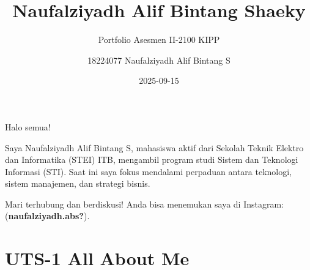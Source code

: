 \documentclass[
  letterpaper,
  DIV=11,
  numbers=noendperiod]{scrreprt}
\title{Naufalziyadh Alif Bintang Shaeky}
\subtitle{Portfolio Asesmen II-2100 KIPP}
\author{18224077 Naufalziyadh Alif Bintang S}
\date{2025-09-15}
\renewcommand*\contentsname{Table of contents}
\newcommand\contentsname{Table of contents}
\begin{document}
\maketitle

\renewcommand*\contentsname{Table of contents}
{
\hypersetup{linkcolor=}
\setcounter{tocdepth}{2}
\tableofcontents
}


\chapter{}\label{section}

Halo semua!

Saya Naufalziyadh Alif Bintang S, mahasiswa aktif dari Sekolah Teknik
Elektro dan Informatika (STEI) ITB, mengambil program studi Sistem dan
Teknologi Informasi (STI). Saat ini saya fokus mendalami perpaduan
antara teknologi, sistem manajemen, dan strategi bisnis.

Mari terhubung dan berdiskusi! Anda bisa menemukan saya di Instagram:
(\textbf{naufalziyadh.abs?}).


\chapter{UTS-1 All About Me}\label{uts-1-all-about-me}
\end{document}
